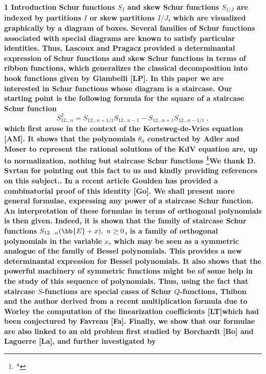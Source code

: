 \bf1  Introduction
\rm\medskip
Schur functions $S_I$ and skew Schur functions $S_{I/J}$ are indexed by 
partitions $I$ or skew partitions $I/J$, which are visualized graphically by 
a diagram of boxes. Several families of Schur functions associated with 
special diagrams are known to satisfy particular identities. Thus, Lascoux 
and Pragacz provided a determinantal expression of Schur functions and skew 
Schur functions in terms of ribbon functions, which generalizes the classical 
decomposition into hook functions given by Giambelli \bf[LP]\rm.
\smallskip
In this paper we are interested in Schur functions whose diagram is 
a staircase. 
Our starting point is the following formula for the square of a staircase
Schur function
$$S_{12\ldots n}^2=S_{12\ldots n+1/1}S_{12\ldots n-1} 
- S_{12\ldots n+1}S_{12\ldots n-1/1}\ ,$$
which first arose in the context of the Korteweg-de-Vries equation {\bf[AM]}.
It shows that the polynomials $\theta_d$ constructed by Adler and Moser
to represent the rational solutions of the KdV equation are, up to
normalization, nothing but staircase Schur functions 
\footnote{*}{\sevenrm We thank D. Svrtan
for pointing out this fact to us and kindly providing references on
this subject.}.
In a recent article Goulden has provided a combinatorial proof of this identity 
\bf[Go]\rm. We shall 
present more general formulae, expressing any power of a staircase Schur 
function.
\smallskip
An interpretation of these formulae in terms of orthogonal polynomials is then given. 
Indeed, it is shown that the family of staircase Schur functions $S_{12\ldots 
n}({\bb{E}}+x),\ n\geq0$, is a family of orthogonal polynomials in the variable $x$, 
which may be seen as a symmetric analogue of the family of Bessel 
polynomials. This provides a new determinantal expression for Bessel 
polynomials. It also shows that the powerful machinery of symmetric functions 
might be of some help in the study of this sequence of polynomials. Thus, 
using the fact that staircase $S$-functions are special cases of Schur $Q$-functions, 
Thibon and the author derived from a recent multiplication formula
due to Worley the computation of the linearization coefficients \bf[LT]\rm which 
had been conjectured by Favreau \bf[Fa]\rm.  
\smallskip
Finally, we show that our formulae are also linked to an old problem first 
studied by Borchardt \bf[Bo] \rm and Laguerre \bf[La]\rm, and further investigated by 
